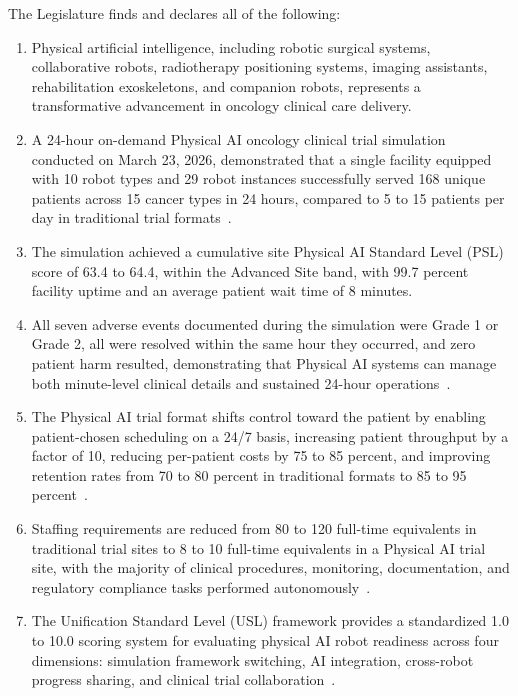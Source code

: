 \documentclass[11pt,letterpaper]{article}
\begin{document}
The Legislature finds and declares all of the following:

\begin{enumerate}[label=(\alph*)]
\item Physical artificial intelligence, including robotic surgical systems,
  collaborative robots, radiotherapy positioning systems, imaging assistants,
  rehabilitation exoskeletons, and companion robots, represents a transformative
  advancement in oncology clinical care delivery.

\item A 24-hour on-demand Physical AI oncology clinical trial simulation
  conducted on March 23, 2026, demonstrated that a single facility equipped
  with 10 robot types and 29 robot instances successfully served 168 unique
  patients across 15 cancer types in 24 hours, compared to 5 to 15 patients per
  day in traditional trial formats~\cite{newtrial2026}.

\item The simulation achieved a cumulative site Physical AI Standard Level (PSL)
  score of 63.4 to 64.4, within the Advanced Site band, with 99.7 percent
  facility uptime and an average patient wait time of 8 minutes.

\item All seven adverse events documented during the simulation were Grade 1 or
  Grade 2, all were resolved within the same hour they occurred, and zero
  patient harm resulted, demonstrating that Physical AI systems can manage
  both minute-level clinical details and sustained 24-hour
  operations~\cite{newtrial2026}.

\item The Physical AI trial format shifts control toward the patient by enabling
  patient-chosen scheduling on a 24/7 basis, increasing patient throughput by a
  factor of 10, reducing per-patient costs by 75 to 85 percent, and improving
  retention rates from 70 to 80 percent in traditional formats to 85 to
  95 percent~\cite{formatcomparison2026}.

\item Staffing requirements are reduced from 80 to 120 full-time equivalents in
  traditional trial sites to 8 to 10 full-time equivalents in a Physical AI
  trial site, with the majority of clinical procedures, monitoring,
  documentation, and regulatory compliance tasks performed
  autonomously~\cite{sitespec2026}.

\item The Unification Standard Level (USL) framework provides a standardized
  1.0 to 10.0 scoring system for evaluating physical AI robot readiness across
  four dimensions: simulation framework switching, AI integration, cross-robot
  progress sharing, and clinical trial collaboration~\cite{usl2026}.


\end{enumerate}
\end{document}
